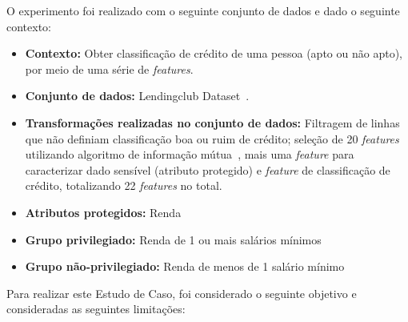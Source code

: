 \documentclass[portugues]{ic-tese}
\begin{document}
O experimento foi realizado com o seguinte conjunto de dados e dado o seguinte contexto:

\begin{itemize}
\item \textbf{Contexto:} Obter classificação de crédito de uma pessoa (apto ou não apto), por meio de uma série de \textit{features}.

\item \textbf{Conjunto de dados:} Lendingclub Dataset~\citep{lendingclub_2022}.

\item \textbf{Transformações realizadas no conjunto de dados:} Filtragem de linhas que não definiam classificação boa ou ruim de crédito; seleção de 20 \textit{features} utilizando algoritmo de informação mútua~\citep{Ross_2014}, mais uma \textit{feature} para caracterizar dado sensível (atributo protegido) e \textit{feature} de classificação de crédito, totalizando 22 \textit{features} no total.

\item \textbf{Atributos protegidos:} Renda

\item \textbf{Grupo privilegiado:} Renda de 1 ou mais salários mínimos

\item \textbf{Grupo não-privilegiado:} Renda de menos de 1 salário mínimo

\end{itemize}

Para realizar este Estudo de Caso, foi considerado o seguinte objetivo e consideradas as seguintes limitações:
\end{document}

